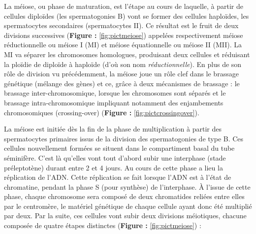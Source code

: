 \documentclass[12pt,a4paper,twoside]{ugathesis}
\theoremstyle{definition}
\theoremstyle{definition}
\theoremstyle{definition}
\theoremstyle{remark}
\begin{document}
La méiose, ou phase de maturation, est l'étape au cours de laquelle, à
partir de cellules diploïdes (les spermatogonies B) vont se former des
cellules haploïdes, les spermatocytes secondaires (spermatocytes II). Ce
résultat est le fruit de deux divisions successives (\textbf{Figure :
}\ref{fig:pictmeiose}) appelées respectivement méiose réductionnelle ou
méiose I (MI) et méiose équationnelle ou méiose II (MII). La MI va
séparer les chromosomes homologues, produisant deux cellules et
réduisant la ploïdie de diploïde à haploïde (d'où son nom
\emph{réductionnelle}). En plus de son rôle de division vu précédemment,
la méiose joue un rôle clef dans le brassage génétique (mélange des
gènes) et ce, grâce à deux mécanismes de brassage : le brassage
inter-chromosomique, lorsque les chromosomes sont séparés et le brassage
intra-chromosomique impliquant notamment des enjambements chromosomiques
(crossing-over) (\textbf{Figure : }\ref{fig:pictcrossingover}).

La méiose est initiée dès la fin de la phase de multiplication à partir
des spermatocytes primaires issus de la division des spermatogonies de
type B. Ces cellules nouvellement formées se situent dans le
compartiment basal du tube séminifère. C'est là qu'elles vont tout
d'abord subir une interphase (stade préleptotène) durant entre 2 et 4
jours. Au cours de cette phase a lieu la réplication de l'ADN. Cette
réplication se fait lorsque l'ADN est à l'état de chromatine, pendant la
phase S (pour synthèse) de l'interphase. À l'issue de cette phase,
chaque chromosome sera composé de deux chromatides reliées entre elles
par le centromère, le matériel génétique de chaque cellule ayant donc
été multiplié par deux. Par la suite, ces cellules vont subir deux
divisions méiotiques, chacune composée de quatre étapes distinctes
(\textbf{Figure : }\ref{fig:pictmeiose}) :
\end{document}
